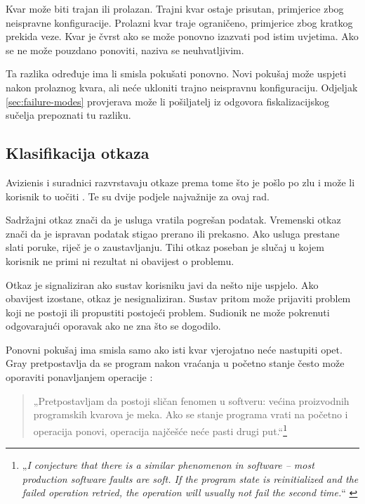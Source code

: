 Kvar može biti trajan ili prolazan. Trajni kvar ostaje prisutan, primjerice
zbog neispravne konfiguracije. Prolazni kvar traje ograničeno, primjerice
zbog kratkog prekida veze. Kvar je čvrst ako se može ponovno izazvati pod
istim uvjetima. Ako se ne može pouzdano ponoviti, naziva se neuhvatljivim.

Ta razlika određuje ima li smisla pokušati ponovno. Novi pokušaj može uspjeti
nakon prolaznog kvara, ali neće ukloniti trajno neispravnu konfiguraciju.
Odjeljak \ref{sec:failure-modes} provjerava može li pošiljatelj iz odgovora
fiskalizacijskog sučelja prepoznati tu razliku.

\subsection{Klasifikacija otkaza}
\label{sec:klasifikacija-otkaza}

Avizienis i suradnici razvrstavaju otkaze prema tome što je pošlo po zlu i
može li korisnik to uočiti \cite{avizienis2004taxonomy}. Te su dvije podjele
najvažnije za ovaj rad.

Sadržajni otkaz znači da je usluga vratila pogrešan podatak. Vremenski otkaz
znači da je ispravan podatak stigao prerano ili prekasno. Ako usluga prestane
slati poruke, riječ je o zaustavljanju. Tihi otkaz poseban je slučaj u kojem
korisnik ne primi ni rezultat ni obavijest o problemu.

Otkaz je signaliziran ako sustav korisniku javi da nešto nije uspjelo. Ako
obavijest izostane, otkaz je nesignaliziran. Sustav pritom može prijaviti
problem koji ne postoji ili propustiti postojeći problem. Sudionik ne može
pokrenuti odgovarajući oporavak ako ne zna što se dogodilo.

Ponovni pokušaj ima smisla samo ako isti kvar vjerojatno neće nastupiti opet.
Gray pretpostavlja da se program nakon vraćanja u početno stanje često može
oporaviti ponavljanjem operacije \cite{gray1986whystop}:

\begin{quote}
„Pretpostavljam da postoji sličan fenomen u softveru: većina proizvodnih
programskih kvarova je meka. Ako se stanje programa vrati na početno i
operacija ponovi, operacija najčešće neće pasti drugi
put.“\footnote{„\emph{I conjecture that there is a similar phenomenon in
software -- most production software faults are soft. If the program state
is reinitialized and the failed operation retried, the operation will
usually not fail the second time.}“ \cite{gray1986whystop}}
\end{quote}

